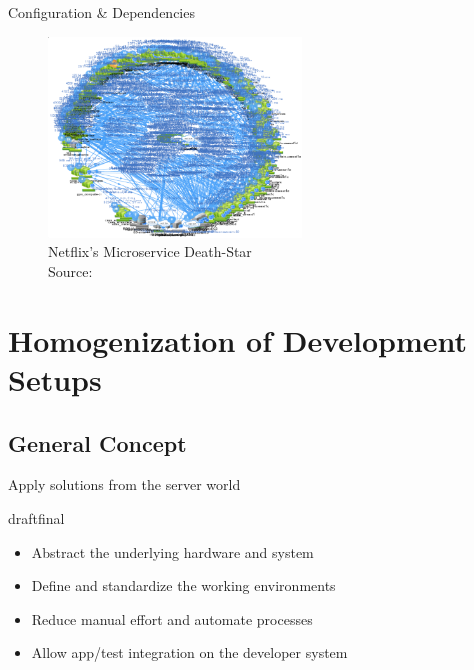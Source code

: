 \documentclass{beamer}
\def\final{final}
\def\status{draft}
\begin{document}
\begin{frame}{}
  \begin{center}
    \Large Configuration \& Dependencies
  \end{center}
  \begin{figure}
    \includegraphics[width=0.6\textwidth]{img/netfix.png}
    \caption{\footnotesize Netflix's Microservice Death-Star \\\textcolor{uos-grey-full}{Source: {\cite{deathstar}}}}
  \end{figure}
\end{frame}


\section{Homogenization of Development Setups}
\subsection{General Concept}
\begin{frame}{}
  \begin{center}
    \Large Apply solutions from the server world
  \end{center}
  \vspace{.8cm}

  \ifx\status\final{}
    \pause{}
  \fi

  \begin{itemize}
    \setlength\itemsep{1.2em}
    \large
    \item Abstract the underlying hardware and system
    \item Define and standardize the working environments
    \item Reduce manual effort and automate processes
    \item Allow app/test integration on the developer system
  \end{itemize}
\end{frame}
\end{document}
